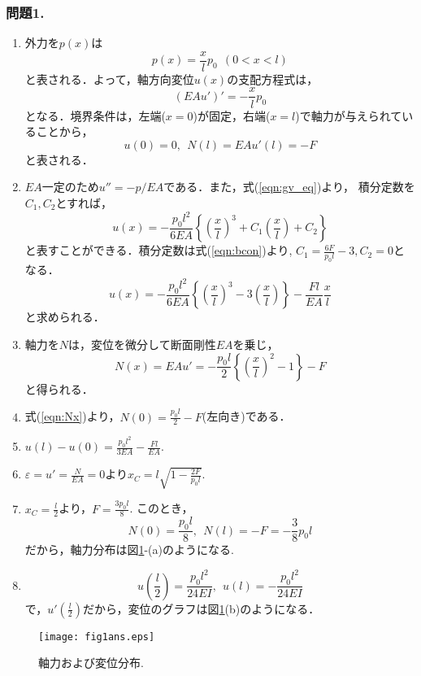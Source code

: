 \documentclass[10pt,a4j]{jarticle}
\begin{document}
\subsubsection*{問題1.}
\begin{enumerate}
\item
	外力を$p(x)$は
	\begin{equation}
		p(x)=\frac{x}{l}p_0 
		\ \ \left(0 < x < l \right)
		\label{eqn:px}
	\end{equation}
	と表される．よって，軸方向変位$u(x)$の支配方程式は，
	\begin{equation}
		\left( EAu' \right)'=-\frac{x}{l}p_0
		\label{eqn:gv_eq}
	\end{equation}
	となる．境界条件は，左端($x=0$)が固定，右端($x=l$)で軸力が与えられていることから，
	\begin{equation}
		u(0)=0, \ \  N(l)=EAu'(l)=-F
		\label{eqn:bcon}
	\end{equation}
	と表される．
\item
	$EA$一定のため$u''=-p/EA$である．また，式(\ref{eqn:gv_eq})より，
	積分定数を$C_1, C_2$とすれば，
	\begin{equation}
		u(x)=-\frac{p_0l^2}{6EA}\left\{
			\left( \frac{x}{l}\right)^3
			+
			C_1\left( \frac{x}{l}\right)
			+
			C_2
		\right\}
	\end{equation}
		と表すことができる．積分定数は式(\ref{eqn:bcon})より, $C_1=\frac{6F}{p_0l}-3, C_2=0$となる．
	\begin{equation}
		u(x)=-\frac{p_0l^2}{6EA}\left\{
			\left( \frac{x}{l}\right)^3
			-
			3
			\left( \frac{x}{l}\right)
		\right\}
		-\frac{Fl}{EA}\frac{x}{l}
		\label{eqn:ux}
	\end{equation}
	と求められる．
\item
	軸力を$N$は，変位を微分して断面剛性$EA$を乗じ，
	\begin{equation}
		N(x)=EAu'=-\frac{p_0l}{2}
			\left\{
			\left(\frac{x}{l}\right)^2 -1
			\right\}
			-F
		\label{eqn:Nx}
	\end{equation}
	と得られる．
\item
	式(\ref{eqn:Nx})より，$N(0)=\frac{p_0l}{2}-F$(左向き)である．
\item
	$u(l)-u(0)=\frac{p_0l^2}{3EA}-\frac{Fl}{EA}$.
\item
	$\varepsilon=u'=\frac{N}{EA}=0$より$x_C=l\sqrt{1-\frac{2F}{p_0l}}$.
\item
	$x_C=\frac{l}{2}$より，$F=\frac{3p_0l}{8}$. このとき，
	\[
		N(0)=\frac{p_0l}{8}, \ \ N(l)=-F=-\frac{3}{8}p_0l
	\]
	だから，軸力分布は図\ref{fig:fig1}-(a)のようになる.
\item
	\[
		u\left(\frac{l}{2}\right)=\frac{p_0l^2}{24EI}, \ \ 
		u\left(l \right)=-\frac{p_0l^2}{24EI}
	\]
	で，$u'(\frac{l}{2})$だから，変位のグラフは図\ref{fig:fig1}(b)のようになる．
\end{enumerate}
\begin{figure}
	\begin{center}
	\texttt{[image: fig1ans.eps]} 
	\end{center}
	\caption{軸力および変位分布.} 
	\label{fig:fig1}
\end{figure}
\newpage
\end{document}
